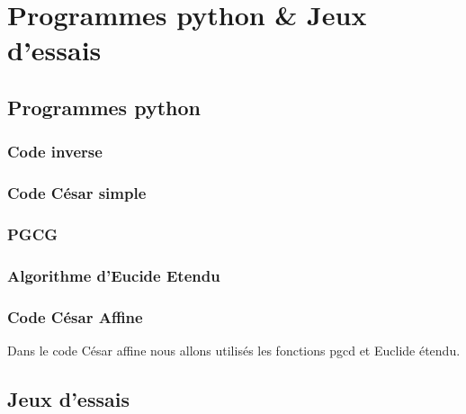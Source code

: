 \documentclass[12pt,french,titlepage]{article}
\begin{document}
	
\section{Programmes python \& Jeux d'essais}	
	
	
	\subsection{Programmes python}
	
		\subsubsection{Code inverse}
		
		
		\subsubsection{Code César simple}
		
		
		
		\subsubsection{PGCG}
		
		
		
		\subsubsection{Algorithme d'Eucide Etendu}
		
		
		
		\subsubsection{Code César Affine}
		
		Dans le code César affine nous allons utilisés les fonctions pgcd et Euclide étendu.
			
		
	
	
	\subsection{Jeux d'essais}	
	
\end{document}
